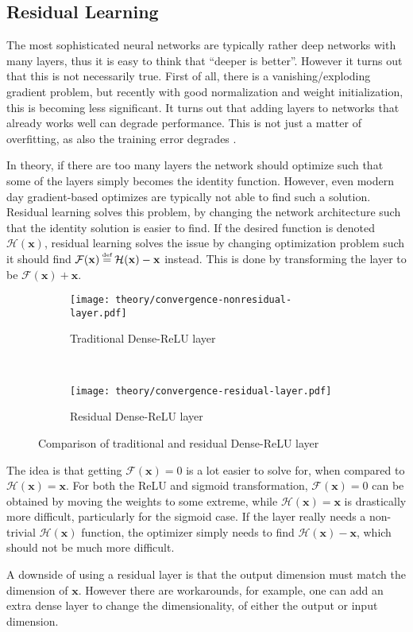 \clearpage
\subsection{Residual Learning}

The most sophisticated neural networks are typically rather deep networks with many layers, thus it is easy to think that ``deeper is better''. However it turns out that this is not necessarily true. First of all, there is a vanishing/exploding gradient problem, but recently with good normalization and weight initialization, this is becoming less significant. It turns out that adding layers to networks that already works well can degrade performance. This is not just a matter of overfitting, as also the training error degrades \cite{residual-learning}.

In theory, if there are too many layers the network should optimize such that some of the layers simply becomes the identity function. However, even modern day gradient-based optimizes are typically not able to find such a solution. Residual learning solves this problem, by changing the network architecture such that the identity solution is easier to find. If the desired function is denoted $\mathcal{H}(\mathbf{x})$, residual learning solves the issue by changing optimization problem such it should find $\mathcal{F}(\mathbf{x}) \defeq \mathcal{H}(\mathbf{x}) - \mathbf{x}$ instead. This is done by transforming the layer to be $\mathcal{F}(\mathbf{x}) + \mathbf{x}$.

\begin{figure}[H]
    \centering
    \begin{subfigure}[b]{0.4\textwidth}
        \centering
        \texttt{[image: theory/convergence-nonresidual-layer.pdf]}
        \caption{Traditional Dense-ReLU layer}
    \end{subfigure}
    ~ %
    \begin{subfigure}[b]{0.4\textwidth}
        \centering
        \texttt{[image: theory/convergence-residual-layer.pdf]}
        \caption{Residual Dense-ReLU layer}
    \end{subfigure}
    \caption{Comparison of traditional and residual Dense-ReLU layer}
\end{figure}

The idea is that getting $\mathcal{F}(\mathbf{x}) = 0$ is a lot easier to solve for, when compared to $\mathcal{H}(\mathbf{x}) = \mathbf{x}$. For both the ReLU and sigmoid transformation, $\mathcal{F}(\mathbf{x}) = 0$ can be obtained by moving the weights to some extreme, while $\mathcal{H}(\mathbf{x}) = \mathbf{x}$ is drastically more difficult, particularly for the sigmoid case. If the layer really needs a non-trivial $\mathcal{H}(\mathbf{x})$ function, the optimizer simply needs to find $\mathcal{H}(\mathbf{x}) - \mathbf{x}$, which should not be much more difficult.

A downside of using a residual layer is that the output dimension must match the dimension of $\mathbf{x}$. However there are workarounds, for example, one can add an extra dense layer to change the dimensionality, of either the output or input dimension.
